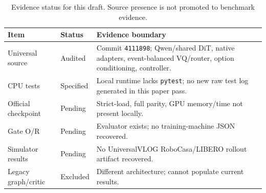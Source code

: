\begin{table}[t]
\centering
\scriptsize
\setlength{\tabcolsep}{3pt}
\begin{tabular}{p{}p{}p{}}
\toprule
Item & Status & Evidence boundary \\
\midrule
Universal source & Audited & Commit \texttt{4111898}; Qwen/shared DiT, native adapters, event-balanced VQ/router, option conditioning, controller. \\
CPU tests & Specified & Local runtime lacks \texttt{pytest}; no new raw test log generated in this paper pass. \\
Official checkpoint & Pending & Strict-load, full parity, GPU memory/time not present locally. \\
Gate O/R & Pending & Evaluator exists; no training-machine JSON recovered. \\
Simulator results & Pending & No UniversalVLOG RoboCasa/LIBERO rollout artifact recovered. \\
Legacy graph/critic & Excluded & Different architecture; cannot populate current results. \\
\bottomrule
\end{tabular}
\caption{Evidence status for this draft.  Source presence is not promoted to
benchmark evidence.}
\label{tab:evaluation-status}
\end{table}
